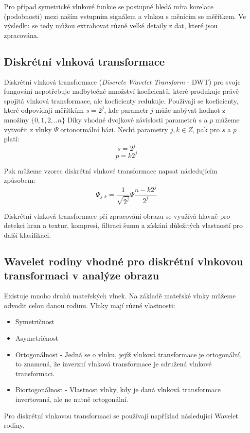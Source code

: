 Pro případ symetrické vlnkové funkce se postupně hledá míra korelace (podobnosti) mezi naším vstupním signálem a vlnkou s měnícím se měřítkem. Ve výsledku se tedy můžou extrahovat různě velké detaily z dat, které jsou zpracována. \cite{WaveletElektrorevue}

\subsection{Diskrétní vlnková transformace}
Diskrétní vlnková transformace (\textit{Discrete Wavelet Transform} - DWT) pro svoje fungování nepotřebuje nadbytečné množství koeficientů, které produkuje právě spojitá vlnková transformace, ale koeficienty redukuje. Používají se koeficienty, které odpovídají měřítkům $s = 2^j$, kde parametr $j$ může nabývat hodnot z množiny $\{0,1,2,..n\}$ Díky vhodné dvojkové závislosti parametrů $s$ a $p$ můžeme vytvořit z vlnky $\Psi$ ortonormální bázi. Nechť parametry $j, k \in Z$, pak pro $s$ a $p$ platí:
$$s = 2^j$$
$$p = k2^j$$

Pak můžeme vzorec diskrétní vlnkové transformace napsat následujícím způsobem:
$$\Psi_{j,k} = \frac{1}{\sqrt{2^j}}\Psi\frac{n-k2^j}{2^j}$$

Diskrétní vlnková transformace při zpracování obrazu se využívá hlavně pro detekci hran a textur, kompresi, filtraci šumu a získání důležitých vlastností pro další klasifikaci. \cite{WaveletElektrorevue}

\subsection{Wavelet rodiny vhodné pro diskrétní vlnkovou transformaci v analýze obrazu}
Existuje mnoho druhů mateřských vlnek. Na základě mateřské vlnky můžeme odvodit celou danou rodinu. Vlnky mají různé vlastnosti: \cite{PyWaveletsBrowser}
\begin{itemize}
    \item Symetričnost
    \item Asymetričnost
    \item Ortogonálnost - Jedná se o vlnku, jejíž vlnková transformace je ortogonální, to znamená, že inverzní vlnková transformace je sdružená vlnkové transformaci. \cite{WaveletBasics} 
    \item Biortogonálnost - Vlastnost vlnky, kdy je daná vlnková transformace invertovaná, ale ne nutně ortogonální. 
\end{itemize}

Pro diskrétní vlnkovou transformaci se používají například následující Wavelet rodiny.

